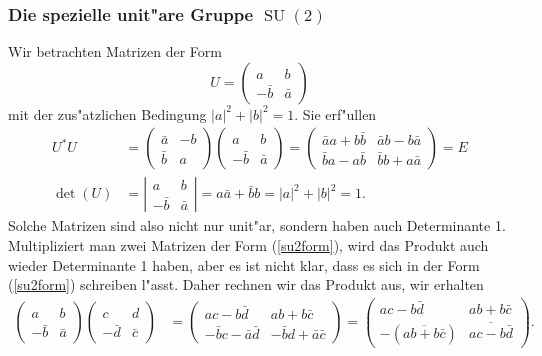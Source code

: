 \subsubsection{Die spezielle unit"are Gruppe $\operatorname{SU}(2)$}
Wir betrachten Matrizen der Form
\begin{equation}
U=
\begin{pmatrix}
a&b\\-\bar b&\bar a
\end{pmatrix}
\label{su2form}
\end{equation}
mit der zus"atzlichen Bedingung $|a|^2 + |b|^2=1$. Sie erf"ullen
\begin{align*}
U^*U
&=
\begin{pmatrix}
\bar a&-b\\\bar b&a
\end{pmatrix}
\begin{pmatrix}
a&b\\-\bar b&\bar a
\end{pmatrix}
=
\begin{pmatrix}
\bar aa+b\bar b & \bar ab-b\bar a\\
\bar ba-a\bar b & \bar bb+a\bar a
\end{pmatrix}
=
E
\\
\det(U)&=\left|
\begin{matrix}
a&b\\-\bar b&\bar a
\end{matrix}
\right|
=
a\bar a+\bar bb = |a|^2 + |b|^2=1.
\end{align*}
Solche Matrizen sind also nicht nur unit"ar, sondern haben auch Determinante 1.
Multipliziert man zwei Matrizen der Form (\ref{su2form}),
wird das Produkt auch wieder Determinante 1 haben, aber es ist nicht klar,
dass es sich in der Form (\ref{su2form}) schreiben l"asst.
Daher rechnen wir das Produkt aus, wir erhalten
\begin{align*}
\begin{pmatrix}  a                        & b                      \\
                 -\bar b                  & \bar a                 \end{pmatrix}
\begin{pmatrix}  c                        & d                      \\
                 -\bar d                  & \bar c                 \end{pmatrix}
&=
\begin{pmatrix}  ac-b\bar d               & ab+b\bar c             \\
                 -\bar bc-\bar a\bar d    & -\bar bd +\bar a\bar c \end{pmatrix}
=
\begin{pmatrix}  ac-b\bar d               & ab+b\bar c             \\
                 -(\overline{ab+b\bar c}) & \overline{ac-b\bar d}  \end{pmatrix}
.
\end{align*}
